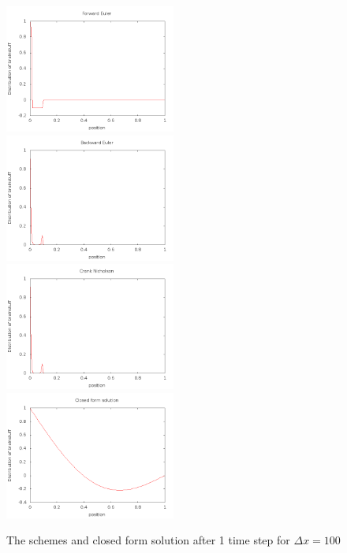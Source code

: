 \documentclass[a4wide,12pt]{article}
\begin{document}
\begin{figure}[hbtp]
	\includegraphics[width=0.5\textwidth]{Forwarddx1001}
	\includegraphics[width=0.5\textwidth]{Backwarddx1001}
	\includegraphics[width=0.5\textwidth]{Crankdx1001}
	\includegraphics[width=0.5\textwidth]{Closedform1001}
	\caption{The schemes and closed form solution after 1 time step for $\Delta x = 100$}
	\label{fig:04}
\end{figure}
\end{document}
